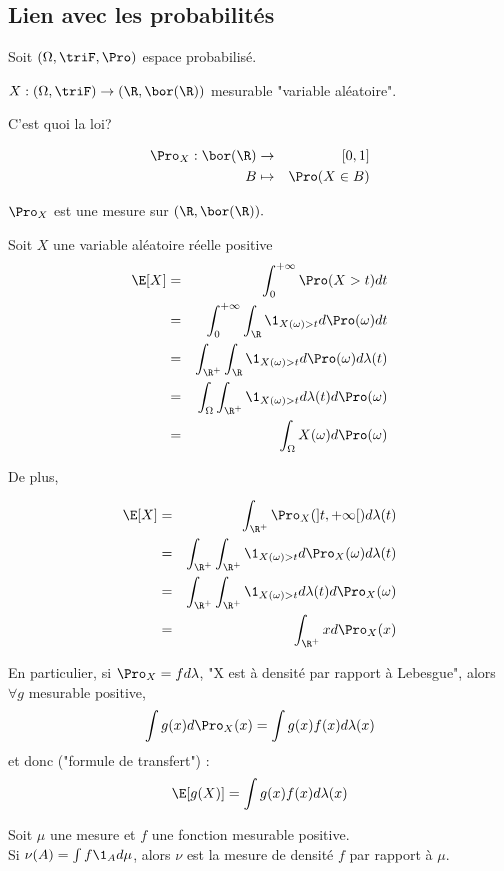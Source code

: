 \subsection{Lien avec les probabilités}




Soit $(\Omega, \triF, \Pro)$ espace probabilisé.

$X : (\Omega,    \triF) \to (\R,  \bor(\R)) $ mesurable "variable aléatoire".

C'est quoi la loi?

\begin{eqnarray*}
	\Pro_X: \bor (\R) &\to& [0,1] \\
	B &\mapsto& \Pro(X  \in B)
\end{eqnarray*}

$\Pro_X$ est une mesure sur $(\R,  \bor(\R)).$

Soit $X$ une variable aléatoire réelle positive\\
\begin{eqnarray*}
	\E[X] &=& \int_0^{+\infty} \Pro (X> t) d t\\
	&=& \int_0^{+\infty}\int_\R \1_{X(\omega)>t}d \Pro (\omega) d t\\
	&=& \int_{\R^+} \int_{\R} \1_{X(\omega)>t}d \Pro (\omega) d \lambda(t) \\ %
	&=& \int_{\Omega} \int_{\R^+} \1_{X(\omega)>t}d \lambda(t) d \Pro (\omega)  \\%
	&=& \int_{\Omega} X(\omega) d \Pro(\omega)
\end{eqnarray*}

De plus,


\begin{eqnarray*}
	\E[X] &=& \int_{\R^+} \Pro_X(]t, +\infty[) d \lambda (t) \\
	&=& \int_{\R^+} \int_{\R^+} \1_{X(\omega)>t}d \Pro_X (\omega) d \lambda(t) \\
	&=& \int_{\R^+} \int_{\R^+} \1_{X(\omega)>t}d \lambda(t) d\Pro_X (\omega)  \\ %
	&=& \int_{\R^+} x d\Pro_X (x)
\end{eqnarray*}

En particulier, si $\Pro_X = fd\lambda$, "X est à densité par rapport à Lebesgue", alors $\forall g$ mesurable positive,
$$\int g(x) d \Pro_X(x) = \int g(x) f(x) d \lambda(x)$$
et donc ("formule de transfert") :
$$ \E[g(X)] = \int g(x) f(x) d \lambda(x)$$

\begin{exemple}
	Soit $\mu$ une mesure et $f$ une fonction mesurable positive.\\
	Si $\nu(A) = \int f \1_A d \mu$, alors $\nu$ est la mesure de densité $f$ par rapport à $\mu$.
\end{exemple}


